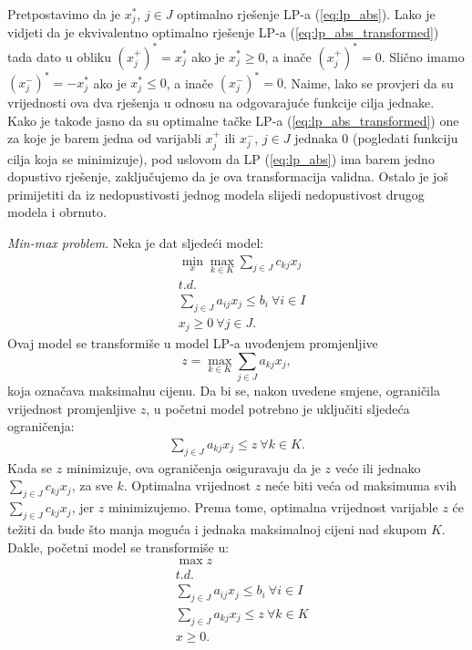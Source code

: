 \documentclass[a4paper, utf8, 11pt, colorlinks]{book}
\theoremstyle{definition}
\begin{document}
Pretpostavimo da je $x_j^*$, $j \in J$ optimalno rješenje LP-a (\ref{eq:lp_abs}).  Lako je vidjeti da je ekvivalentno optimalno rješenje LP-a (\ref{eq:lp_abs_transformed}) tada dato u obliku $(x_j^+)^* = x_j^*$  ako je $x_j^* \geq 0$, a inače $(x_j^+)^* = 0$. Slično imamo $(x_j^-)^* = - x_j^*$  ako je $x_j^* \leq 0$, a inače $(x_j^-)^* = 0$. Naime, lako se provjeri da su vrijednosti ova dva rješenja u odnosu na odgovarajuće funkcije cilja jednake. Kako je takođe jasno da su optimalne tačke LP-a (\ref{eq:lp_abs_transformed}) one za koje je barem jedna od varijabli $x_j^+$ ili $x_j^-$, $j \in J$  jednaka 0 (pogledati funkciju cilja koja se minimizuje), pod uslovom da LP (\ref{eq:lp_abs}) ima barem jedno dopustivo rješenje, zaključujemo da je ova transformacija validna. Ostalo je još primijetiti da iz  nedopustivosti jednog modela slijedi nedopustivost drugog modela i obrnuto. %


\emph{Min-max problem}. Neka je dat sljedeći model: 
\begin{align*}
	&\min_{x} \max_{k \in K} \sum_{j \in J} c_{kj} x_j \\
	&{t.d.} \nonumber \\
	& \sum_{j \in J} a_{ij} x_j \leq b_i\  \forall i \in I \\
	& x_j \geq 0\ \forall j \in J.
\end{align*}
Ovaj  model se transformiše u model LP-a uvođenjem promjenljive 
 $$z=\max_{k \in K} \sum_{j \in J} a_{kj}x_j,$$
  koja označava maksimalnu cijenu. Da bi se, nakon uvedene smjene, ograničila vrijednost promjenljive $z$, u početni model potrebno je uključiti sljedeća ograničenja: 
\begin{eqnarray}
	\sum_{j \in J} a_{kj} x_j \leq z\ \forall k \in K.
\end{eqnarray}
Kada se $z$ minimizuje, ova ograničenja osiguravaju da je $z$ veće ili jednako  $\sum_{j \in J} c_{kj}x_j$, za sve $k$. Optimalna vrijednost $z$ neće biti veća od maksimuma svih $\sum_{j \in J} c_{kj}x_j$, jer  $z$ minimizujemo. Prema tome, optimalna vrijednost varijable $z$ će težiti da bude što manja moguća i jednaka maksimalnoj cijeni nad skupom $K$. Dakle, početni model se transformiše u:
\begin{align*}
	&\max z \\
    &{t.d.} \nonumber \\
	&\sum_{j \in J} a_{ij} x_j \leq b_i\  \forall i \in I \\ 
	& 	 \sum_{j \in J} a_{kj} x_j \leq z\ \forall k \in K \\
	& x \geq 0.
\end{align*}
\end{document}
